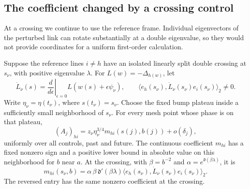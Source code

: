 \subsection{The coefficient changed by a crossing control}

At a crossing we continue to use the reference frame.  Individual
eigenvectors of the perturbed link can rotate substantially at a double
eigenvalue, so they would not provide coordinates for a uniform first-order
calculation.

\begin{proposition}
\label{n:prop-outward-crossing}
Suppose the reference lines \(i\neq h\) have an isolated linearly split
double crossing at \(s_\nu\), with positive eigenvalue \(\lambda\).
For \(L(w)=-\Delta_{h(w)}\), let
\[
 \dot L_{\nu}(s)
 =\left.\frac{d}{d\epsilon}\right|_{\epsilon=0}
       L(w(s)+\epsilon\psi_\nu),
 \qquad
 \langle e_h(s_\nu),\dot L_\nu(s_\nu)e_i(s_\nu)\rangle_2\neq0.
\]
Write $\eta_\nu=\eta(t_\nu)$, where $s(t_\nu)=s_\nu$.
Choose the fixed bump plateau inside a sufficiently small neighborhood of
\(s_\nu\).  For every mesh point whose phase is on that plateau,
\begin{equation}
 (A_j)_{hi}
 =z_\nu\eta_\nu^{3/4}m_{hi}(s(j),b(j))+o(\delta_j),
 \label{n:eq-off-diagonal-outward}
\end{equation}
uniformly over all controls, past and future.  The continuous coefficient
\(m_{hi}\) has a fixed nonzero sign and a positive lower bound in absolute
value on this neighborhood for \(b\) near \(a\).  At the crossing, with
\(\beta=b^{-2}\) and \(\alpha=e^{\mathfrak d(\beta\lambda)}\), it is
\begin{equation}
 m_{hi}(s_\nu,b)
 =\alpha\,\beta\,\mathfrak d'(\beta\lambda)
       \langle e_h(s_\nu),\dot L_\nu(s_\nu)e_i(s_\nu)\rangle_2 .
 \label{n:eq-crossing-leading-coefficient}
\end{equation}
The reversed entry has the same nonzero coefficient at the crossing.
\end{proposition}

